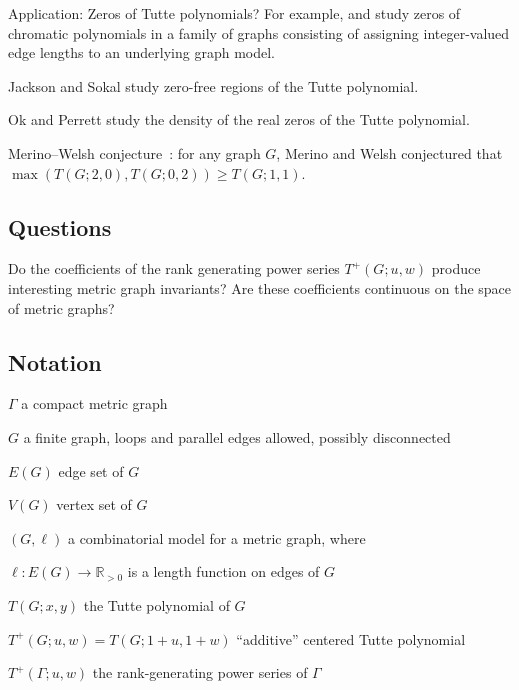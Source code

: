 \documentclass{amsart}
\theoremstyle{definition}
\newcommand{\RR}{\mathbb{R}}
\newcommand{\RRpos}{\RR_{>0}}
\begin{document}
Application: Zeros of Tutte polynomials?
For example, \cite{brown-hickman} and \cite{BHSW} study zeros of chromatic polynomials in a family of graphs consisting of assigning integer-valued edge lengths to an underlying graph model.

Jackson and Sokal \cite{JS} study zero-free regions of the Tutte polynomial.

Ok and Perrett \cite{OP} study the density of the real zeros of the Tutte polynomial.

Merino--Welsh conjecture~\cite{merino-welsh}: for any graph $G$, Merino and Welsh conjectured that $\max(T(G; 2,0), T(G; 0,2)) \geq T(G; 1,1)$.

\subsection{Questions}

Do the coefficients of the rank generating power series $T^+(G; u,w)$ produce interesting metric graph invariants?
Are these coefficients continuous on the space of metric graphs?

\subsection{Notation}

$\Gamma$ a compact metric graph

$G$ a finite graph, 
loops and parallel edges allowed,
possibly disconnected

$E(G)$ edge set of $G$

$V(G)$ vertex set of $G$

$(G,\ell)$ a combinatorial model for a metric graph,
where 

$\ell : E(G) \to \RRpos$
is a length function on edges of $G$

$T(G; x,y)$ the Tutte polynomial of $G$

$T^+(G; u,w) = T(G; 1+u,1+w)$ ``additive'' centered Tutte polynomial

$T^+(\Gamma; u,w)$ the rank-generating power series of $\Gamma$




\end{document}
